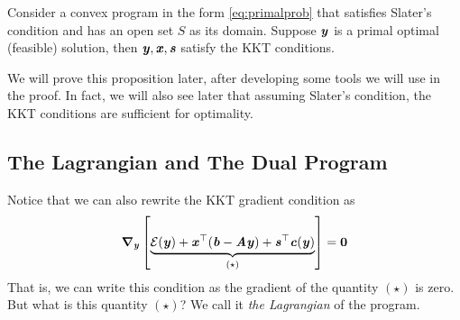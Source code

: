 \begin{proposition}
  \label{pro:KKTnecessary}
  Consider a convex program in the form \eqref{eq:primalprob} that
  satisfies Slater's condition and has an open set $S$ as its domain.
  Suppose $\boldsymbol{\mathit{y}}$ is a primal optimal (feasible) solution,
  then  $\boldsymbol{\mathit{y}}, \boldsymbol{\mathit{x}}, \boldsymbol{\mathit{s}}$ satisfy the KKT conditions.
\end{proposition}

We will prove this proposition later, after developing some tools we will
use in the proof.
In fact, we will also see later that assuming Slater's condition, the KKT
conditions are sufficient for optimality.

\subsection{The Lagrangian and The Dual Program}

Notice that we can also rewrite the KKT gradient condition as
\[
  \boldsymbol{\nabla}_{\boldsymbol{\mathit{y}}}
  \left[ \underbrace{\mathcal{E}(\boldsymbol{\mathit{y}}) + \boldsymbol{\mathit{x}}^{\top}(\boldsymbol{\mathit{b}}-\boldsymbol{\mathit{A}}\boldsymbol{\mathit{y}}) +
      \boldsymbol{\mathit{s}}^{\top}\boldsymbol{\mathit{c}}(\boldsymbol{\mathit{y}})
    }_{(\star)}
    \right]
= \boldsymbol{0}
  \]
That is, we can write this condition as the gradient of the quantity
$(\star)$ is zero.
But what is this quantity $(\star)$?
We call it \emph{the Lagrangian} of the program.

